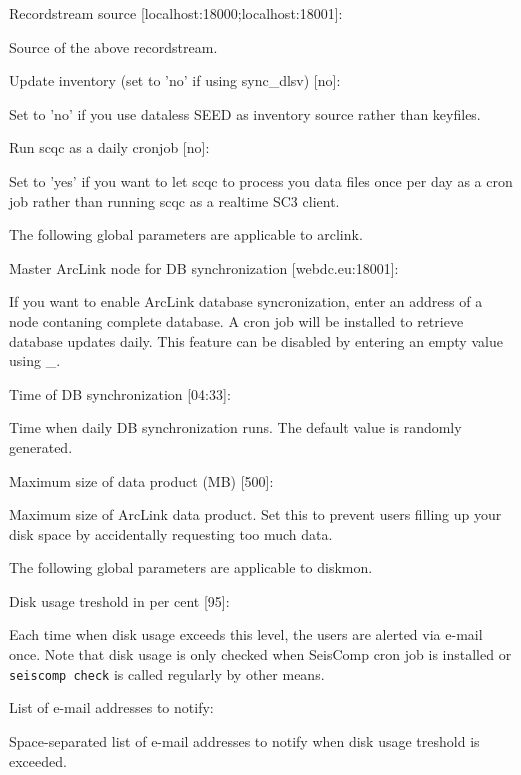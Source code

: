 \documentclass[11pt,a4paper,titlepage]{article}
\newcommand{\pkg}[1]{\textsf{#1}}
\newcommand{\cmd}[1]{\texttt{#1}}
\newcommand{\seiscomp}{SeisComp }
\begin{document}
\begin{interface}
\item Recordstream source [localhost:18000;localhost:18001]:

Source of the above recordstream.

\item Update inventory (set to 'no' if using sync_dlsv) [no]:

Set to 'no' if you use dataless SEED as inventory source rather than
keyfiles.

\item Run scqc as a daily cronjob [no]:

Set to 'yes' if you want to let scqc to process you data files once per
day as a cron job rather than running scqc as a realtime SC3 client.

\end{interface}

The following global parameters are applicable to \pkg{arclink}.
\begin{interface}
\item Master ArcLink node for DB synchronization [webdc.eu:18001]:

If you want to enable ArcLink database syncronization, enter an address of
a node contaning complete database. A cron job will be installed to
retrieve database updates daily. This feature can be disabled by entering
an empty value using \_.

\item Time of DB synchronization [04:33]:

Time when daily DB synchronization runs. The default value is randomly
generated.

\item Maximum size of data product (MB) [500]:

Maximum size of ArcLink data product. Set this to prevent users filling up
your disk space by accidentally requesting too much data.
\end{interface}

The following global parameters are applicable to \pkg{diskmon}.
\begin{interface}
\item Disk usage treshold in per cent [95]:

Each time when disk usage exceeds this level, the users are alerted via
e-mail once. Note that disk usage is only checked when \seiscomp cron job
is installed or \cmd{seiscomp check} is called regularly by other means.

\item List of e-mail addresses to notify:

Space-separated list of e-mail addresses to notify when disk usage treshold
is exceeded.
\end{interface}
\end{document}
